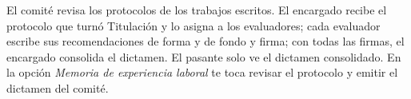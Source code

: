 \documentclass[11pt,a4paper]{article}
\begin{document}
{\small\tableofcontents}
\newpage
\begin{quevasahacer}
El comité revisa los protocolos de los trabajos escritos. El encargado recibe el protocolo que turnó Titulación y lo asigna a los evaluadores; cada evaluador escribe sus recomendaciones de forma y de fondo y firma; con todas las firmas, el encargado consolida el dictamen. El pasante solo ve el dictamen consolidado. En la opción \emph{Memoria de experiencia laboral} te toca revisar el protocolo y emitir el dictamen del comité.
\end{quevasahacer}



\end{document}
